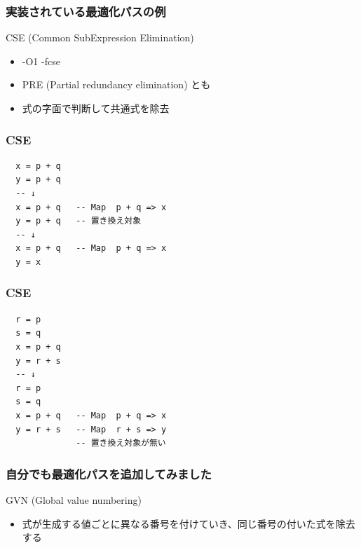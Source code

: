 \documentclass[cjk,dvipdfm,14pt]{beamer}
\begin{document}

\begin{frame}[fragile]
\frametitle{実装されている最適化パスの例}

CSE (Common SubExpression Elimination)

\begin{itemize}
\item -O1 -fcse
\item PRE (Partial redundancy elimination) とも
\item 式の字面で判断して共通式を除去
\end{itemize}



\end{frame}

\begin{frame}[fragile]
\frametitle{CSE}

\begin{lstlisting}
  x = p + q
  y = p + q
  -- ↓
  x = p + q   -- Map  p + q => x
  y = p + q   -- 置き換え対象
  -- ↓
  x = p + q   -- Map  p + q => x
  y = x
\end{lstlisting}

\end{frame}



\begin{frame}[fragile]
\frametitle{CSE}

\begin{lstlisting}
  r = p
  s = q
  x = p + q
  y = r + s
  -- ↓
  r = p
  s = q
  x = p + q   -- Map  p + q => x
  y = r + s   -- Map  r + s => y
              -- 置き換え対象が無い
\end{lstlisting}

\end{frame}





\begin{frame}[fragile]
\frametitle{自分でも最適化パスを追加してみました}

GVN (Global value numbering)

\begin{itemize}
\item 式が生成する値ごとに異なる番号を付けていき、同じ番号の付いた式を除去する
\end{itemize}

\end{frame}
\end{document}
